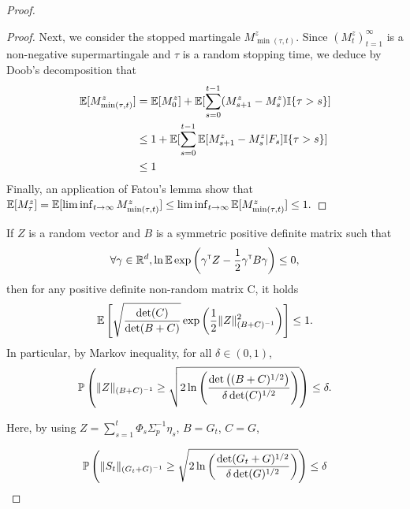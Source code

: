 \documentclass{article}
\begin{document}
\begin{proof}
\begin{proof}
Next, we consider the stopped martingale $M_{\min(\tau,t)}^z$. Since 
$(M_t^z)_{t=1}^\infty$ is a non-negative supermartingale and $\tau$ is a random stopping time, we deduce by Doob's decomposition that
\begin{align*}
\operatorname*{\mathbb{E}}[M_{\min(\tau,t)}^z] &= \operatorname*{\mathbb{E}}[M_0^z] + \operatorname*{\mathbb{E}}[\sum_{s=0}^{t-1} (M_{s+1}^z-M_s^z) \mathbb{I}\{\tau>s\}]\\
&\leq 1 + \operatorname*{\mathbb{E}}[\sum_{s=0}^{t-1} \operatorname*{\mathbb{E}}[M_{s+1}^z-M_s^z|F_{s}] \mathbb{I}\{\tau>s\}]\\
&\leq 1
\end{align*}
Finally, an application of Fatou's lemma show that 
$\operatorname*{\mathbb{E}}[M_\tau^z] = \operatorname*{\mathbb{E}}[\liminf_{t\to\infty} M_{\min(\tau,t)}^z] \leq \liminf_{t\to\infty} \operatorname*{\mathbb{E}}[M_{\min(\tau,t)}^z] \leq 1.$
\end{proof}






\begin{lemma}
If $Z$ is a random vector and $B$ is a symmetric positive definite matrix such that
\[\forall \gamma\in\mathbb{R}^d, \ln \operatorname*{\mathbb{E}} \exp \left(\gamma^{\mathsf{\scriptscriptstyle T}} Z -\frac{1}{2} \gamma^{\mathsf{\scriptscriptstyle T}} B \gamma \right)\leq 0,\]
then for any positive definite non-random matrix C, it holds
\[\operatorname*{\mathbb{E}}\left[ \sqrt{\frac{\det(C)}{\det(B+C)} } \exp\left( \frac{1}{2}\|Z\|^2_{(B+C)^{-1}}\right)\right]\leq 1. \] 
In particular, by Markov inequality, for all $\delta\in(0,1)$, 
\[\mathbb{P}\left(\|Z\|_{(B+C)^{-1}} \geq \sqrt{2\ln \left(\frac{\det \left((B+C)^{1/2}\right)}{\delta\det(C)^{1/2}}\right)}\right)\leq \delta.\]
\end{lemma}

Here, by using $Z = \sum_{s=1}^t\Phi_s\Sigma_p^{-1}\eta_s$, $B=G_t$, $C=G$,

\[
\mathbb{P}\left(\| S_t \|_{(G_t+G)^{-1}} \geq \sqrt{2\ln \left(\frac{\det(G_t+G)^{1/2}}{\delta\det(G)^{1/2}}\right)}\right) \leq \delta
\]

\end{proof}
\end{document}
